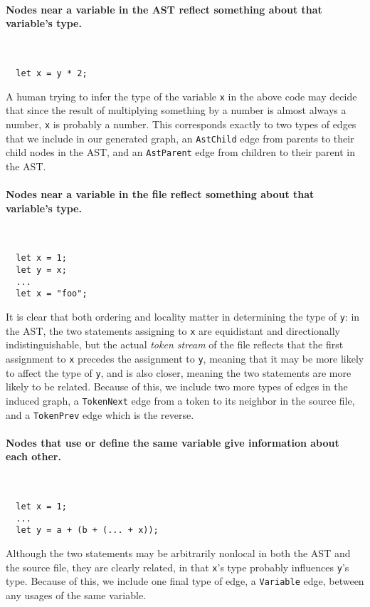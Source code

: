 \paragraph{Nodes near a variable in the AST reflect something about that variable's type.}\
\ %
\begin{lstlisting}
  let x = y * 2;
\end{lstlisting}
A human trying to infer the type of the variable \texttt{x} in the above code may decide that since the result of multiplying something by a number is almost always a number, \texttt{x} is probably a number.
This corresponds exactly to two types of edges that we include in our generated graph, an \texttt{AstChild} edge from parents to their child nodes in the AST, and an \texttt{AstParent} edge from children to their parent in the AST.

\par\paragraph{Nodes near a variable in the file reflect something about that variable's type.}
\ %
\begin{lstlisting}
  let x = 1;
  let y = x;
  ...
  let x = "foo";
\end{lstlisting}
It is clear that both ordering and locality matter in determining the type of \texttt{y}: in the AST, the two statements assigning to \texttt{x} are equidistant and directionally indistinguishable, but the actual \emph{token stream} of the file reflects that the first assignment to \texttt{x} precedes the assignment to \texttt{y}, meaning that it may be more likely to affect the type of \texttt{y}, and is also closer, meaning the two statements are more likely to be related.
Because of this, we include two more types of edges in the induced graph, a \texttt{TokenNext} edge from a token to its neighbor in the source file, and a \texttt{TokenPrev} edge which is the reverse.

\paragraph{Nodes that use or define the same variable give information about each other.}
\ %
\begin{lstlisting}
  let x = 1;
  ...
  let y = a + (b + (... + x));
\end{lstlisting}
Although the two statements may be arbitrarily nonlocal in both the AST and the source file, they are clearly related, in that \texttt{x}'s type probably influences \texttt{y}'s type.
Because of this, we include one final type of edge, a \texttt{Variable} edge, between any usages of the same variable.

